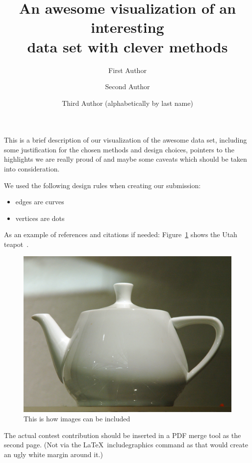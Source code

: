 \documentclass[runningheads]{llncs}
\begin{document}
%
\title{An awesome visualization of an interesting\\data set with clever methods}
%
%
\author{First Author \and
Second Author \and
Third Author (alphabetically by last name)}
%
\authorrunning{}
%
%
\maketitle              %
%
%
%
%

This is a brief description of our visualization of the awesome data set, including some justification for the chosen methods and design choices, pointers to the highlights we are really proud of and maybe some caveats which should be taken into consideration. 

We used the following design rules when creating our submission:
\begin{itemize}
	\item edges are curves
	\item vertices are dots
\end{itemize}

As an example of references and citations if needed: Figure~\ref{fig1} shows the Utah teapot~\cite{blinn1976texture}.

\begin{figure}
	\centering
\includegraphics[width=.5\textwidth]{Original_Utah_Teapot.jpg}
\caption{This is how images can be included} \label{fig1}
\end{figure}


The actual contest contribution should be inserted in a PDF merge tool as the second page. (Not via the \LaTeX\ includegraphics command as that would create an ugly white margin around it.)


%
%
%
 
 
%
%
\end{document}

